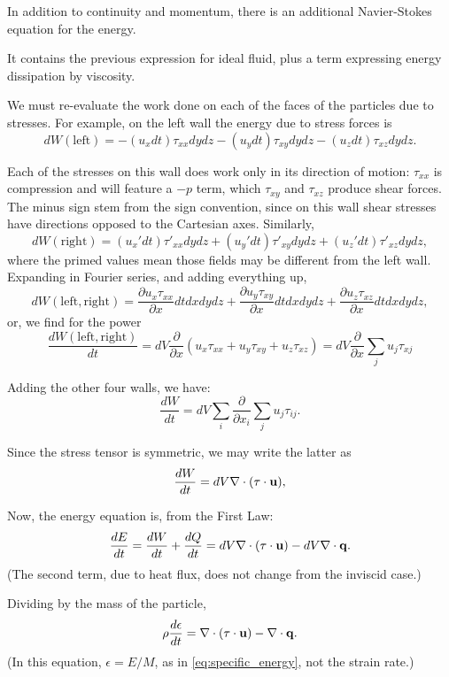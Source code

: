In addition to continuity and momentum, there is an additional
Navier-Stokes equation for the energy.

It contains the previous expression for ideal fluid, plus a term
expressing energy dissipation by viscosity.

We must re-evaluate the work done on each of the faces of the
particles due to stresses. For example, on the left wall the energy
due to stress forces is
\[
dW(\mathrm{left})  =
 -(u_x dt)   \tau_{xx} dy dz
 -(u_y dt)   \tau_{xy} dy dz
 -(u_z dt)   \tau_{xz} dy dz .
\]

Each of the stresses on this wall does work only in its direction of
motion: $\tau_{xx}$ is compression and will feature a $-p$ term, which
$\tau_{xy}$ and $\tau_{xz}$ produce shear forces. The minus sign stem
from the sign convention, since on this wall shear stresses have
directions opposed to the Cartesian axes. Similarly,
\[
dW(\mathrm{right})  =
 (u_x' dt)   \tau'_{xx}  dy dz
+(u_y' dt)   \tau'_{xy} dy dz
+(u_z' dt)   \tau'_{xz} dy dz ,
\]
where the primed values mean those fields may be different from the
left wall. Expanding in Fourier series, and adding everything up,
\[
dW(\mathrm{left,right})  =
 \frac{\partial u_x \tau_{xx}}{\partial x}  dt dx  dy dz  +
 \frac{\partial u_y \tau_{xy}}{\partial x}  dt dx  dy dz  +
 \frac{\partial u_z \tau_{xz}}{\partial x}  dt dx  dy dz ,
 \]
or, we find for the power
\[
\frac{dW(\mathrm{left,right})}{dt}  =
dV 
\frac{\partial }{\partial x}
\left(
 u_x \tau_{xx} +
 u_y \tau_{xy} +
 u_z \tau_{xz}
 \right) =
dV 
\frac{\partial }{\partial x}
\sum_j u_j \tau_{xj}
\]

Adding the other four walls, we have:
\[
\frac{dW}{dt}  =
dV
 \sum_i \frac{\partial }{\partial x_i} \sum_j u_j \tau_{ij} .
\]

Since the stress tensor is symmetric, we may write the latter as
\[
\frac{dW}{dt}  =
dV
\nabla\cdot ( \tau \cdot  \mathbf{u} ) ,
\]

Now, the energy equation is, from the First Law:
\[
\frac{dE}{dt}  = \frac{dW}{dt} + \frac{dQ}{dt} =
dV \nabla\cdot ( \tau \cdot  \mathbf{u} ) - dV\nabla\cdot\mathbf{q} .
\]
(The second term, due to heat flux, does not change from the inviscid
case.)

Dividing by the mass of the particle,
\begin{equation}
\label{eq:NS_en_2}
\rho \frac{d \epsilon }{dt}  = 
 \nabla\cdot ( \tau \cdot  \mathbf{u} ) - \nabla\cdot\mathbf{q} .
\end{equation}
(In this equation, $\epsilon=E/M$, as in \ref{eq:specific_energy}, not
the strain rate.)


